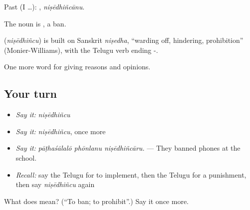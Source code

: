 Past (I …): , \emph{niṣēdhiñcānu}.

The noun is , a ban.

\begin{cousinweb}
\textbf{} (\emph{niṣēdhiñcu}) is built on Sanskrit \emph{niṣedha}, \textquotedblleft{}warding off, hindering, prohibition\textquotedblright{} (Monier-Williams), with the Telugu verb ending -.
\end{cousinweb}

\begin{grammarlens}[title={What you've built}]
One more word for giving reasons and opinions.
\end{grammarlens}

\subsection*{Your turn}
\begin{itemize}
\raggedright
  \item \emph{Say it:} \emph{niṣēdhiñcu}
  \item \emph{Say it:} \emph{niṣēdhiñcu}, once more
  \item \emph{Say it:} \emph{pāṭhaśālalō phōnlanu niṣēdhiñcāru.} — They banned phones at the school.
  \item \emph{Recall:} say the Telugu for to implement, then the Telugu for a punishment, then say \emph{niṣēdhiñcu} again
\end{itemize}

\begin{tcolorbox}[breakable,colback=teal!4,colframe=teal!35!black,title={Before you move on}]
What does  mean? (\textquotedblleft{}To ban; to prohibit\textquotedblright{}.) Say it once more.
\end{tcolorbox}
